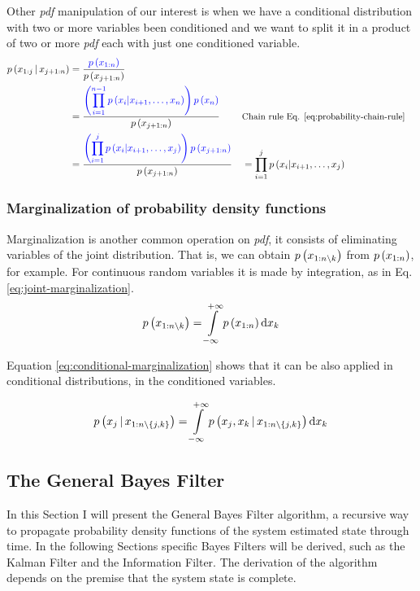 \documentclass[12pt]{article}
\begin{document}
Other \textit{pdf} manipulation of our interest is when we have a conditional distribution with two or more variables been conditioned and we want to split it in a product of two or more \textit{pdf} each with just one conditioned variable. 
\begin{equation}
\begin{aligned}
    \pr{x_{1:j} \given x_{j+1:n}} &=  \dfrac{\blue{\pr{x_{1:n}}}}{\pr{x_{j+1:n}}} \\
    &= \dfrac{\displaystyle\blue{ \left(\prod_{i = 1}^{n-1} \pr{x_i | x_{i+1}, \dots, x_n} \right) \pr{x_n} } }{\pr{x_{j+1:n}}} && \small\text{Chain rule Eq. \ref{eq:probability-chain-rule}} \\
    &= \dfrac{\displaystyle \blue{ \left(\prod_{i = 1}^{j} \pr{x_i | x_{i+1}, \dots, x_j} \right) \pr{x_{j+1:n}} } }{\pr{x_{j+1:n}}} &&= \prod_{i = 1}^{j} \pr{x_i | x_{i+1}, \dots, x_j}
\end{aligned}
\label{eq:conditional-manipulation-2}
\end{equation}

\subsubsection{Marginalization of probability density functions}
Marginalization is another common operation on \textit{pdf}, it consists of eliminating variables of the joint distribution. That is, we can obtain $p\left(x_{1:n \setminus k}\right)$ from $p\left(x_{1:n}\right)$, for example. For continuous random variables it is made by integration, as in Eq. \ref{eq:joint-marginalization}.
\begin{equation}
    \pr{x_{1:n \setminus k}} = \Int[x_k]{-\infty}{+\infty}{\pr{x_{1:n}}}
    \label{eq:joint-marginalization}
\end{equation}

Equation \ref{eq:conditional-marginalization} shows that it can be also applied in conditional distributions, in the conditioned variables.

\begin{equation}
    \pr{x_j \given x_{1:n \setminus \cbrac{j, k}}} =  \Int[x_k]{-\infty}{+\infty}{\pr{x_j, x_k \given x_{1:n \setminus \cbrac{j, k}}} }
    \label{eq:conditional-marginalization}
\end{equation}

\subsection{The General Bayes Filter}
\label{sec:bayes-filter}
In this Section I will present the General Bayes Filter algorithm, a recursive way to propagate probability density functions of the system estimated state through time. In the following Sections specific Bayes Filters will be derived, such as the Kalman Filter and the Information Filter. The derivation of the algorithm depends on the premise that the system state is complete.
\end{document}
